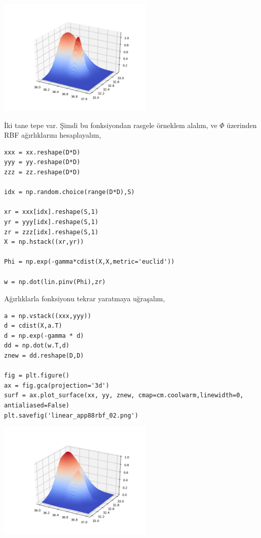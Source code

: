 \documentclass[12pt,fleqn]{article}\usepackage{../../common}
\begin{document}
\includegraphics[width=20em]{linear_app88rbf_01.png}

İki tane tepe var. Şimdi bu fonksiyondan rasgele örneklem alalım, ve $\Phi$
üzerinden RBF ağırlıklarını hesaplayalım,

\begin{verbatim}
xxx = xx.reshape(D*D)
yyy = yy.reshape(D*D)
zzz = zz.reshape(D*D)

idx = np.random.choice(range(D*D),S)

xr = xxx[idx].reshape(S,1)
yr = yyy[idx].reshape(S,1)
zr = zzz[idx].reshape(S,1)
X = np.hstack((xr,yr))

Phi = np.exp(-gamma*cdist(X,X,metric='euclid'))

w = np.dot(lin.pinv(Phi),zr)
\end{verbatim}

Ağırlıklarla fonksiyonu tekrar yaratmaya uğraşalım,

\begin{verbatim}
a = np.vstack((xxx,yyy))
d = cdist(X,a.T)
d = np.exp(-gamma * d)
dd = np.dot(w.T,d)
znew = dd.reshape(D,D)

fig = plt.figure()
ax = fig.gca(projection='3d')
surf = ax.plot_surface(xx, yy, znew, cmap=cm.coolwarm,linewidth=0, antialiased=False)
plt.savefig('linear_app88rbf_02.png')
\end{verbatim}

\includegraphics[width=20em]{linear_app88rbf_02.png}
\end{document}
